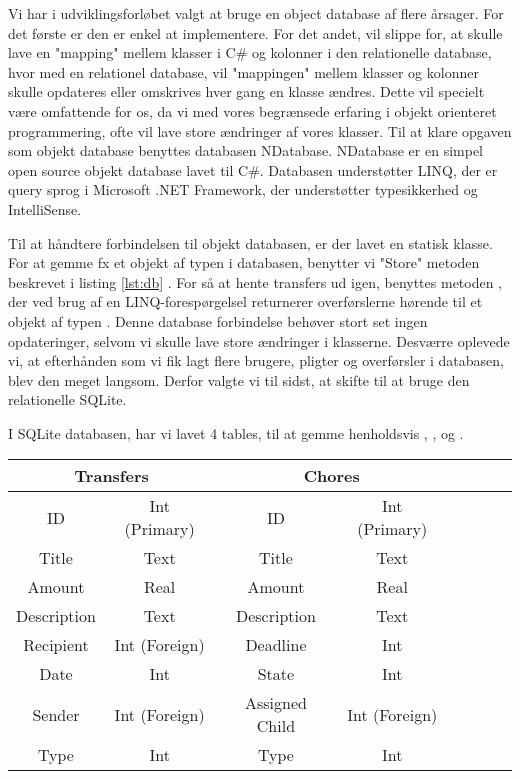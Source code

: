 Vi har i udviklingsforløbet valgt at bruge en object database af flere årsager. For det første er den er enkel at implementere. For det andet, vil slippe for, at skulle lave en "mapping" mellem klasser i C\# og kolonner i den relationelle database, hvor med en relationel database, vil "mappingen" mellem klasser og kolonner skulle opdateres eller omskrives hver gang en klasse ændres. Dette vil specielt være omfattende for os, da vi med vores begrænsede erfaring i objekt orienteret programmering, ofte vil lave store ændringer af vores klasser.
Til at klare opgaven som objekt database benyttes databasen NDatabase. NDatabase er en simpel open source objekt database lavet til C\#. Databasen understøtter LINQ, der er query sprog i Microsoft .NET Framework, der understøtter typesikkerhed og IntelliSense\cite{linqdok}.

Til at håndtere forbindelsen til objekt databasen, er der lavet en statisk klasse. For at gemme fx et objekt af typen  i databasen, benytter vi "Store" metoden beskrevet i listing \ref{lst:db} . For så at hente transfers ud igen, benyttes metoden , der ved brug af en LINQ-forespørgelsel returnerer overførslerne hørende til et objekt af typen . Denne database forbindelse behøver stort set ingen opdateringer, selvom vi skulle lave store ændringer i klasserne.
Desværre oplevede vi, at efterhånden som vi fik lagt flere brugere, pligter og overførsler i databasen, blev den meget langsom. Derfor valgte vi til sidst, at skifte til at bruge den relationelle SQLite.

I SQLite databasen, har vi lavet 4 tables, til at gemme henholdsvis , ,  og .


\begin{tabular}{||c|c||c|c||c|c||c|c}
\hline 
\multicolumn{2}{||c||}{Transfers} & \multicolumn{2}{c||}{Chores}\\
\hline
ID & Int (Primary) & ID & Int (Primary) \\ 
\hline 
Title & Text & Title & Text \\ 
\hline 
Amount & Real & Amount & Real \\ 
\hline 
Description & Text & Description & Text \\ 
\hline 
Recipient & Int (Foreign) & Deadline & Int \\ 
\hline 
Date & Int & State & Int \\ 
\hline 
Sender & Int (Foreign) & Assigned Child & Int (Foreign) \\ 
\hline 
Type & Int & Type & Int \\ 
\hline 
\end{tabular} 

